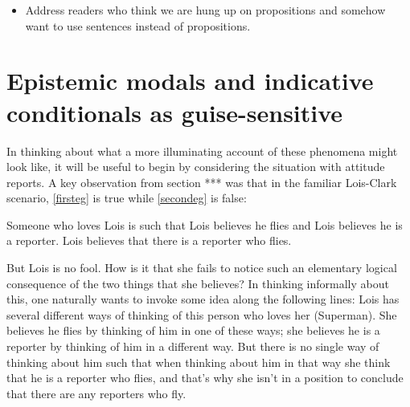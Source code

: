 \documentclass[If.tex]{subfiles}
\begin{document}
\begin{itemize}
    \item 
    Address readers who think we are hung up on propositions and somehow want to use sentences instead of propositions.
\end{itemize}


















		


\section{Epistemic modals and indicative conditionals as guise-sensitive}
In thinking about what a more illuminating account of these phenomena might look like, it will be useful to begin by considering the situation with attitude reports.  A key observation from section *** was that in the familiar Lois-Clark scenario, \ref{firsteg} is true while \ref{secondeg} is false:  
\begin{prop}
    \nitem \label{firsteg}
    Someone who loves Lois is such that Lois believes he flies and Lois believes he is a reporter.
    \nitem \label{secondeg}
    Lois believes that there is a reporter who flies.
\end{prop}
But Lois is no fool.  How is it that she fails to notice such an elementary logical consequence of the two things that she believes?  In thinking informally about this, one naturally wants to invoke some idea along the following lines: Lois has several different ways of thinking of this person who loves her (Superman).  She believes he flies by thinking of him in one of these ways; she believes he is a reporter by thinking of him in a different way.  But there is no single way of thinking about him such that when thinking about him in that way she think that he is a reporter who flies, and that's why she isn't in a position to conclude that there are any reporters who fly.  
\end{document}
